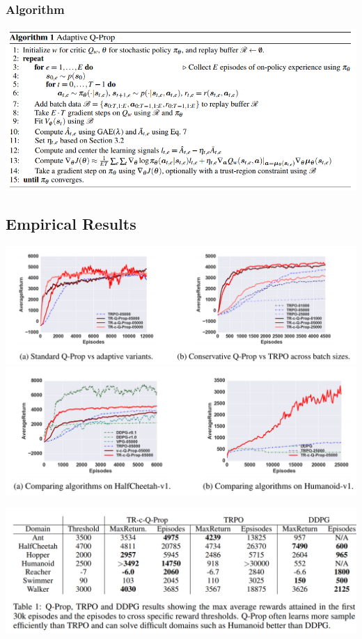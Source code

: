 \documentclass{beamer}
\begin{document}
\begin{frame}[t]
\frametitle{Algorithm}
\includegraphics[scale=0.35]{q-prop-algo}
\end{frame}

\subsection{Empirical Results}
\begin{frame}[t]
\includegraphics[scale=0.23]{q-prop1}
\includegraphics[scale=0.23]{q-prop2}
\end{frame}

\begin{frame}
\includegraphics[scale=0.21]{q-prop3}
\end{frame}
\end{document}
